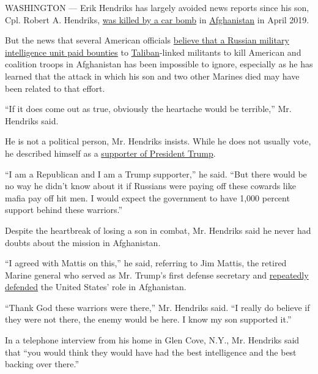WASHINGTON --- Erik Hendriks has largely avoided news reports since his
son, Cpl. Robert A. Hendriks,
\href{https://www.marinecorpstimes.com/news/your-marine-corps/2019/04/12/remains-of-3-marines-killed-in-afghanistan-returned-to-us/}{was
killed by a car bomb} in
\href{https://www.nytimes.com/2020/07/01/world/asia/afghan-russia-bounty-middleman.html}{Afghanistan}
in April 2019.

But the news that several American officials
\href{https://www.nytimes.com/2020/06/29/us/politics/russian-bounty-trump.html}{believe
that a Russian military intelligence unit paid bounties} to
\href{https://www.nytimes.com/2020/07/01/world/asia/afghan-russia-bounty-middleman.html}{Taliban}-linked
militants to kill American and coalition troops in Afghanistan has been
impossible to ignore, especially as he has learned that the attack in
which his son and two other Marines died may have been related to that
effort.

``If it does come out as true, obviously the heartache would be
terrible,'' Mr. Hendriks said.

He is not a political person, Mr. Hendriks insists. While he does not
usually vote, he described himself as a
\href{https://www.nytimes.com/2020/07/01/upshot/poll-trump-defectors-2020-election.html}{supporter
of President Trump}.

``I am a Republican and I am a Trump supporter,'' he said. ``But there
would be no way he didn't know about it if Russians were paying off
these cowards like mafia pay off hit men. I would expect the government
to have 1,000 percent support behind these warriors.''

Despite the heartbreak of losing a son in combat, Mr. Hendriks said he
never had doubts about the mission in Afghanistan.

``I agreed with Mattis on this,'' he said, referring to Jim Mattis, the
retired Marine general who served as Mr. Trump's first defense secretary
and
\href{https://www.nwaonline.com/news/2019/dec/14/mattis-gives-views-on-afghanistan-20191/}{repeatedly
defended} the United States' role in Afghanistan.

``Thank God these warriors were there,'' Mr. Hendriks said. ``I really
do believe if they were not there, the enemy would be here. I know my
son supported it.''

In a telephone interview from his home in Glen Cove, N.Y., Mr. Hendriks
said that ``you would think they would have had the best intelligence
and the best backing over there.''


